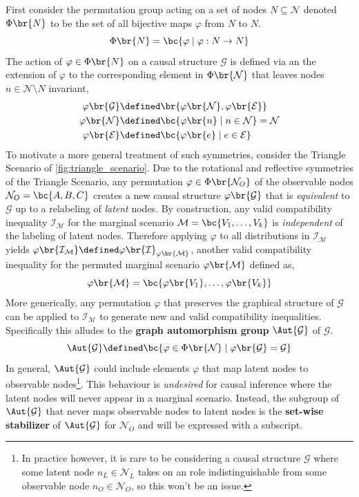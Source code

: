 \documentclass[aps, 10pt, english, twoside, pra, nofootinbib, longbibliography]{revtex4-1}
\theoremstyle{plain}
\theoremstyle{definition}
\theoremstyle{remark}
\newcommand{\graph}{\mathcal{G}}
\newcommand{\nodes}{\mathcal{N}}
\newcommand{\edges}{\mathcal{E}}
\newcommand{\term}[1]{\textcolor{Mahogany}{\textbf{#1}}}
\begin{document}
    First consider the permutation group acting on a set of nodes $N \subseteq \nodes$ denoted $\Phi\br{N}$ to be the set of all bijective maps $\varphi$ from $N$ to $N$.
    \[ \Phi\br{N} = \bc{\varphi \mid \varphi : N \to N} \]
    The action of $\varphi \in \Phi\br{N}$ on a causal structure $\graph$ is defined via an the extension of $\varphi$ to the corresponding element in $\Phi\br{\nodes}$ that leaves nodes $n \in \nodes \setminus N$ invariant,
    \begin{align*}
    \varphi\br{\graph} &\defined \br{\varphi\br{\nodes}, \varphi\br{\edges}} \\
    \varphi\br{\nodes} &\defined \bc{\varphi\br{n} \mid n \in \nodes} = \nodes \\
    \varphi\br{\edges} &\defined \bc{\varphi\br{e} \mid e \in \edges}
    \end{align*}
    To motivate a more general treatment of such symmetries, consider the Triangle Scenario of \cref{fig:triangle_scenario}. Due to the rotational and reflective symmetries of the Triangle Scenario, any permutation $\varphi \in \Phi\br{\nodes_O}$ of the observable nodes $\nodes_O = \bc{A, B, C}$ creates a new causal structure $\varphi\br{\graph}$ that is \textit{equivalent} to $\graph$ up to a relabeling of \textit{latent} nodes. By construction, any valid compatibility inequality $\mathcal{I}_{\mathcal{M}}$ for the marginal scenario $\mathcal{M} = \bc{V_1, \ldots, V_k}$ is \textit{independent} of the labeling of latent nodes. Therefore applying $\varphi$ to all distributions in $\mathcal{I}_{\mathcal{M}}$ yields $\varphi\br{\mathcal{I}_{\mathcal{M}}} \defined \varphi\br{\mathcal{I}}_{\varphi\br{\mathcal{M}}}$, another valid compatibility inequality for the permuted marginal scenario $\varphi\br{\mathcal{M}}$ defined as,
    \[ \varphi\br{\mathcal{M}} = \bc{\varphi\br{V_1}, \ldots, \varphi\br{V_k}} \]
    More generically, any permutation $\varphi$ that preserves the graphical structure of $\graph$ can be applied to $\mathcal{I}_{\mathcal{M}}$ to generate new and valid compatibility inequalities. Specifically this alludes to the \term{graph automorphism group} $\Aut{\graph}$ of $\graph$.
    \[ \Aut{\graph} \defined \bc{\varphi \in \Phi\br{\nodes} \mid \varphi\br{\graph} = \graph} \]
    In general, $\Aut{\graph}$ could include elements $\varphi$ that map latent nodes to observable nodes\footnote{In practice however, it is rare to be considering a causal structure $\graph$ where some latent node $n_L \in \nodes_L$ takes on an role indistinguishable from some observable node $n_O \in \nodes_O$, so this won't be an issue.}. This behaviour is \textit{undesired} for causal inference where the latent nodes will never appear in a marginal scenario. Instead, the subgroup of $\Aut{\graph}$ that never maps observable nodes to latent nodes is the \term{set-wise stabilizer} of $\Aut{\graph}$ for $\nodes_O$ and will be expressed with a subscript.
\end{document}
